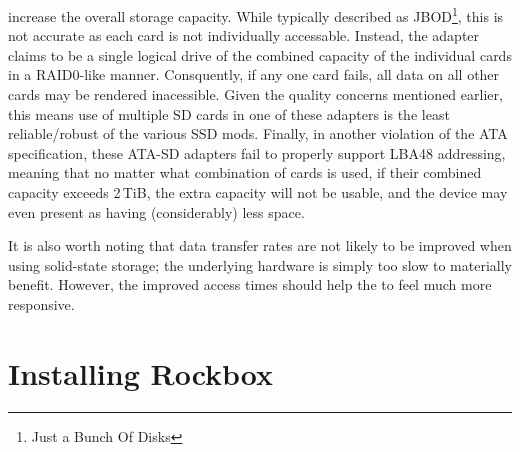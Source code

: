 {\begin{description}
  increase the overall storage capacity. While typically described as JBOD\footnote{Just a Bunch Of Disks}, this is not accurate as each card is not individually accessable.  Instead, the adapter claims to be a single logical drive of the combined capacity of the individual cards in a RAID0-like manner. Consquently, if any one card fails, all data on all other cards may be rendered inacessible.  Given the quality concerns mentioned earlier, this means use of multiple SD cards in one of these adapters is the least reliable/robust of the various SSD mods.  Finally, in another violation of the ATA specification, these ATA-SD adapters fail to properly support LBA48 addressing, meaning that no matter what combination of cards is used, if their combined capacity exceeds 2\,TiB, the extra capacity will not be usable, and the device may even present as having (considerably) less space.
\end{description}


It is also worth noting that data transfer rates are not likely to be improved when using solid-state storage; the underlying \dap{} hardware is simply too slow to materially benefit. However, the improved access times should help the \dap{} to feel much more responsive.
}

\section{Installing Rockbox}\label{sec:installing_rockbox}

